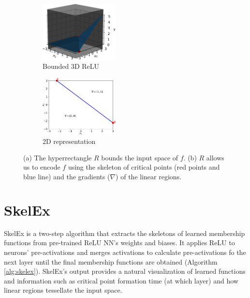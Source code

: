 \documentclass{article}
\begin{document}
\begin{figure}[t]
    \begin{subfigure}{4cm}
        \centering
        \includegraphics[width=4cm]{Figures/3d_hyperrectangle.pdf}
        \caption{Bounded 3D ReLU}
        \label{fig:bounded_3d_relu}
    \end{subfigure}
    \begin{subfigure}{4cm}
        \centering
        \includegraphics[width=4cm]{Figures/hyperrectangle_result.pdf}
        \caption{2D representation}
        \label{fig:2d_result}
    \end{subfigure}
    \caption{(a) The hyperrectangle $R$ bounds the input space of $f$. (b) $R$ allows us to encode $f$ using the skeleton of critical points (red points and blue line) and the gradients ($\nabla$) of the linear regions.}
    \vspace{-3mm}
    \label{fig:hyperrectangle_visualization}
\end{figure}

\section{SkelEx}
\label{sec:3}

SkelEx is a two-step algorithm that extracts the skeletons of learned membership functions from pre-trained ReLU NN's weights and biases. It applies ReLU to neurons' pre-activations and merges activations to calculate pre-activations fo the next layer until the final membership functions are obtained (Algorithm \ref{alg:skelex}). SkelEx's output provides a natural visualization of learned functions and information such as critical point formation time (at which layer) and how linear regions tessellate the input space. 
\end{document}
